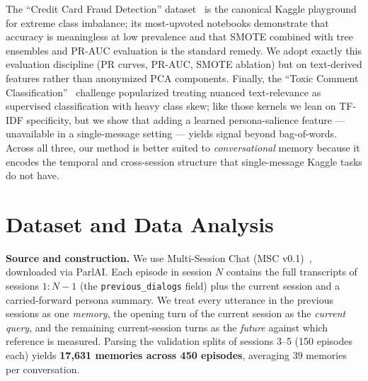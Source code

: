\documentclass[11pt]{article}
\begin{document}
The ``Credit Card Fraud Detection'' dataset~\cite{kaggle_fraud} is the canonical
Kaggle playground for extreme class imbalance; its most-upvoted notebooks
demonstrate that accuracy is meaningless at low prevalence and that SMOTE combined
with tree ensembles and PR-AUC evaluation is the standard remedy. We adopt exactly
this evaluation discipline (PR curves, PR-AUC, SMOTE ablation) but on text-derived
features rather than anonymized PCA components. Finally, the ``Toxic Comment
Classification''~\cite{kaggle_toxic} challenge popularized treating nuanced
text-relevance as supervised classification with heavy class skew; like those
kernels we lean on TF-IDF specificity, but we show that adding a learned
persona-salience feature --- unavailable in a single-message setting --- yields
signal beyond bag-of-words. Across all three, our method is better suited to
\emph{conversational} memory because it encodes the temporal and cross-session
structure that single-message Kaggle tasks do not have.

\section{Dataset and Data Analysis}\label{sec:data}
\textbf{Source and construction.} We use Multi-Session Chat
(MSC v0.1)~\cite{msc}, downloaded via ParlAI. Each episode in session $N$ contains
the full transcripts of sessions $1{:}N{-}1$ (the \texttt{previous\_dialogs}
field) plus the current session and a carried-forward persona summary. We treat
every utterance in the previous sessions as one \emph{memory}, the opening turn of
the current session as the \emph{current query}, and the remaining current-session
turns as the \emph{future} against which reference is measured. Parsing the
validation splits of sessions 3--5 (150 episodes each) yields
\textbf{17{,}631 memories across 450 episodes}, averaging $39$ memories per
conversation.
\end{document}
